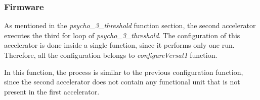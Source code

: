 \documentclass{article}
\begin{document}
\subsubsection{Firmware}

As mentioned in the \textit{psycho\_3\_threshold} function section, the second accelerator executes the third for loop of \textit{psycho\_3\_threshold}.
The configuration of this accelerator is done inside a single function, since it performs only one run. Therefore, all the configuration belongs to \textit{configureVersat1} function.

In this function, the process is similar to the previous configuration function, since the second accelerator does not contain any functional unit that is not present in the first accelerator.
\end{document}
